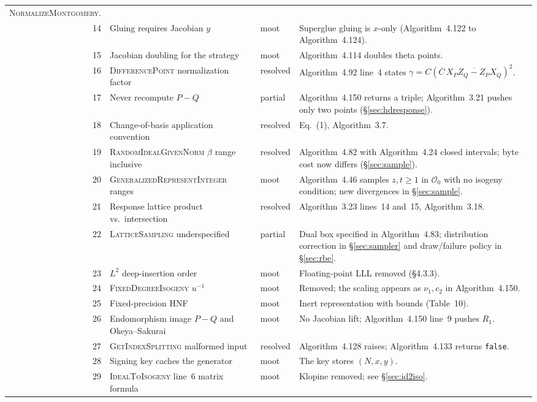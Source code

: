 \documentclass[a4paper,11pt]{article}
\newcommand{\algo}[1]{Algorithm~#1}
\newcommand{\Oo}{\mathcal{O}_0}
\newcommand{\code}[1]{\texttt{#1}}
\begin{document}
\begin{longtable}{@{}r >{\raggedright\arraybackslash}p{}
  >{\raggedright\arraybackslash}p{}
  >{\raggedright\arraybackslash}p{}@{}}
  \textsc{NormalizeMontgomery}. \\
14 & Gluing requires Jacobian $y$ & moot &
  Superglue gluing is $x$-only (\algo{4.122} to \algo{4.124}). \\
15 & Jacobian doubling for the strategy & moot &
  \algo{4.114} doubles theta points. \\
16 & \textsc{DifferencePoint} normalization factor & resolved &
  \algo{4.92} line~4 states
  $\gamma = C(\overline{C}\,\overline{X_P Z_Q - Z_P X_Q})^2$. \\
17 & Never recompute $P - Q$ & partial &
  \algo{4.150} returns a triple; \algo{3.21} pushes only two points
  (\S\ref{sec:hdresponse}). \\
18 & Change-of-basis application convention & resolved &
  Eq.~(1), \algo{3.7}. \\
19 & \textsc{RandomIdealGivenNorm} $\beta$ range inclusive & resolved &
  \algo{4.82} with \algo{4.24} closed intervals; byte cost now differs
  (\S\ref{sec:sample}). \\
20 & \textsc{GeneralizedRepresent\allowbreak{}Integer} ranges & moot &
  \algo{4.46} samples $z, t \ge 1$ in $\Oo$ with no isogeny condition;
  new divergences in \S\ref{sec:sample}. \\
21 & Response lattice product vs.\ intersection & resolved &
  \algo{3.23} lines~14 and~15, \algo{3.18}. \\
22 & \textsc{LatticeSampling} underspecified & partial &
  Dual box specified in \algo{4.83}; distribution correction in
  \S\ref{sec:sampler} and draw/failure policy in \S\ref{sec:rbe}. \\
23 & $L^2$ deep-insertion order & moot &
  Floating-point LLL removed (\S4.3.3). \\
24 & \textsc{FixedDegreeIsogeny} $u^{-1}$ & moot &
  Removed; the scaling appears as $\nu_1, c_2$ in \algo{4.150}. \\
25 & Fixed-precision HNF & moot &
  Inert representation with bounds (Table~10). \\
26 & Endomorphism image $P - Q$ and Okeya--Sakurai & moot &
  No Jacobian lift; \algo{4.150} line~9 pushes $R_1$. \\
27 & \textsc{GetIndexSplitting} malformed input & resolved &
  \algo{4.128} raises; \algo{4.133} returns \code{false}. \\
28 & Signing key caches the generator & moot &
  The key stores $(N, x, y)$. \\
29 & \textsc{IdealToIsogeny} line~6 matrix formula & moot &
  Klopine removed; see \S\ref{sec:id2iso}. \\

\end{longtable}
\end{document}
